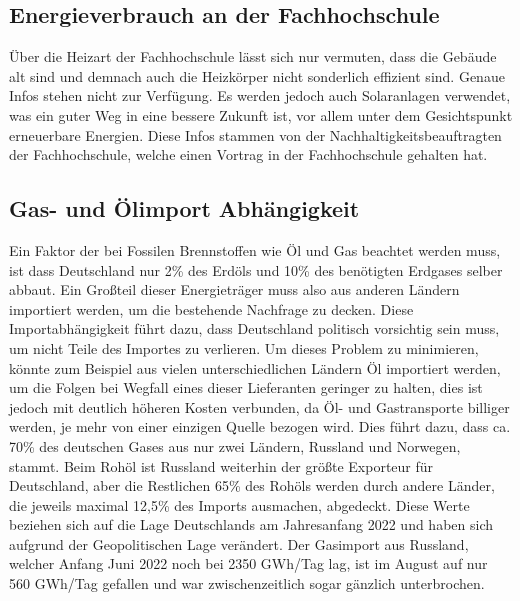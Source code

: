 \documentclass[a4paper,12pt]{scrartcl}
\begin{document}
\subsection{Energieverbrauch an der Fachhochschule}
Über die Heizart der Fachhochschule lässt sich nur vermuten, dass die Gebäude alt sind und demnach auch die Heizkörper nicht sonderlich effizient sind. Genaue Infos stehen nicht zur Verfügung. Es werden jedoch auch Solaranlagen verwendet, was ein guter Weg in eine bessere Zukunft ist, vor allem unter dem Gesichtspunkt erneuerbare Energien. Diese Infos stammen von der Nachhaltigkeitsbeauftragten der Fachhochschule, welche einen Vortrag in der Fachhochschule gehalten hat.

\subsection{Gas- und Ölimport Abhängigkeit}
\label{gas-und-öl-abhängigkeit}
Ein Faktor der bei Fossilen Brennstoffen wie Öl und Gas beachtet werden muss, ist dass Deutschland nur 2\% des Erdöls und 10\% des benötigten Erdgases selber abbaut. Ein Großteil dieser Energieträger muss also aus anderen Ländern importiert werden, um die bestehende Nachfrage zu decken. Diese Importabhängigkeit führt dazu, dass Deutschland politisch vorsichtig sein muss, um nicht Teile des Importes zu verlieren. Um dieses Problem zu minimieren, könnte zum Beispiel aus vielen unterschiedlichen Ländern Öl importiert werden, um die Folgen bei Wegfall eines dieser Lieferanten geringer zu halten, dies ist jedoch mit deutlich höheren Kosten verbunden, da Öl- und Gastransporte billiger werden, je mehr von einer einzigen Quelle bezogen wird. Dies führt dazu, dass ca. 70\% des deutschen Gases aus nur zwei Ländern, Russland und Norwegen, stammt. Beim Rohöl ist Russland weiterhin der größte Exporteur für Deutschland, aber die Restlichen 65\% des Rohöls werden durch andere Länder, die jeweils maximal 12,5\% des Imports ausmachen, abgedeckt. 
Diese Werte beziehen sich auf die Lage Deutschlands am Jahresanfang 2022 und haben sich aufgrund der Geopolitischen Lage verändert. Der Gasimport aus Russland, welcher Anfang Juni 2022 noch bei 2350 GWh/Tag lag, ist im August auf nur 560 GWh/Tag gefallen und war zwischenzeitlich sogar gänzlich unterbrochen.
\end{document}
